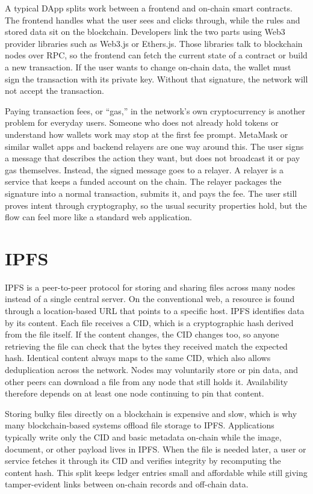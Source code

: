 A typical \ac{DApp} splits work between a frontend and on-chain smart contracts. The frontend handles what the user sees and clicks through, while the rules and stored data sit on the blockchain. Developers link the two parts using Web3 provider libraries such as Web3.js or Ethers.js. Those libraries talk to blockchain nodes over \ac{RPC}, so the frontend can fetch the current state of a contract or build a new transaction. If the user wants to change on-chain data, the wallet must sign the transaction with its private key. Without that signature, the network will not accept the transaction.

Paying transaction fees, or ``gas,'' in the network's own cryptocurrency is another problem for everyday users. Someone who does not already hold tokens or understand how wallets work may stop at the first fee prompt. MetaMask or similar wallet apps and backend relayers are one way around this. The user signs a message that describes the action they want, but does not broadcast it or pay gas themselves. Instead, the signed message goes to a relayer. A relayer is a service that keeps a funded account on the chain. The relayer packages the signature into a normal transaction, submits it, and pays the fee. The user still proves intent through cryptography, so the usual security properties hold, but the flow can feel more like a standard web application.


\section{\ac{IPFS}}

\ac{IPFS} is a peer-to-peer protocol for storing and sharing files across many nodes instead of a single central server. On the conventional web, a resource is found through a location-based URL that points to a specific host. \ac{IPFS} identifies data by its content. Each file receives a \ac{CID}, which is a cryptographic hash derived from the file itself. If the content changes, the \ac{CID} changes too, so anyone retrieving the file can check that the bytes they received match the expected hash. Identical content always maps to the same \ac{CID}, which also allows deduplication across the network. Nodes may voluntarily store or pin data, and other peers can download a file from any node that still holds it. Availability therefore depends on at least one node continuing to pin that content.

Storing bulky files directly on a blockchain is expensive and slow, which is why many blockchain-based systems offload file storage to \ac{IPFS}. Applications typically write only the \ac{CID} and basic metadata on-chain while the image, document, or other payload lives in \ac{IPFS}. When the file is needed later, a user or service fetches it through its \ac{CID} and verifies integrity by recomputing the content hash. This split keeps ledger entries small and affordable while still giving tamper-evident links between on-chain records and off-chain data.

